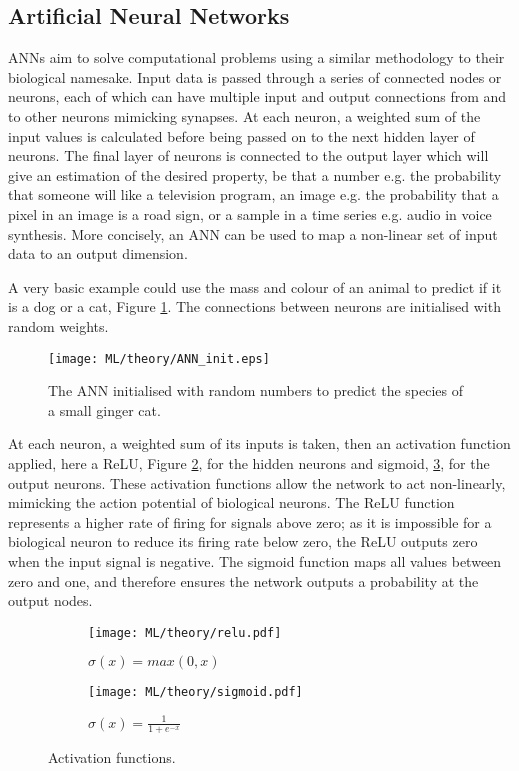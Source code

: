 \subsection{Artificial Neural Networks}
\acp{ANN} aim to solve computational problems using a similar methodology to their biological namesake. Input data is passed through a series of connected nodes or neurons, each of which can have multiple input and output connections from and to other neurons mimicking synapses. At each neuron, a weighted sum of the input values is calculated before being passed on to the next hidden layer of neurons. The final layer of neurons is connected to the output layer which will give an estimation of the desired property, be that a number e.g. the probability that someone will like a television program, an image e.g. the probability that a pixel in an image is a road sign, or a sample in a time series e.g. audio in voice synthesis. More concisely, an \ac{ANN} can be used to map a non-linear set of input data to an output dimension.

A very basic example could use the mass and colour of an animal to predict if it is a dog or a cat, Figure \ref{fig:ml_theory_init}. The connections between neurons are initialised with random weights. 

\begin{figure}[H]
	\centering
	\texttt{[image: ML/theory/ANN\_init.eps]}
	\caption{The \ac{ANN} initialised with random numbers to predict the species of a small ginger cat.}
	\label{fig:ml_theory_init}	
\end{figure}

At each neuron, a weighted sum of its inputs is taken, then an activation function applied, here a \ac{ReLU}, Figure \ref{fig:ml_theory_activation_relu}, for the hidden neurons and sigmoid, \ref{fig:ml_theory_activation_sigmoid}, for the output neurons. These activation functions allow the network to act non-linearly, mimicking the action potential of biological neurons. The \ac{ReLU} function represents a higher rate of firing for signals above zero; as it is impossible for a biological neuron to reduce its firing rate below zero, the \ac{ReLU} outputs zero when the input signal is negative. The sigmoid function maps all values between zero and one, and therefore ensures the network outputs a probability at the output nodes.

\begin{figure}[H]
	\centering
	\begin{subfigure}[c]{0.47\textwidth}
		\centering
		\texttt{[image: ML/theory/relu.pdf]}
		\caption{$\sigma (x) = max(0, x)$}
		\label{fig:ml_theory_activation_relu}
	\end{subfigure}
	\hfill
	\begin{subfigure}[c]{0.47\textwidth}
		\centering
		\texttt{[image: ML/theory/sigmoid.pdf]}
		\caption{$\sigma(x) = \frac{1}{1 + e^{-x}}$}
		\label{fig:ml_theory_activation_sigmoid}
	\end{subfigure}
	\caption{Activation functions.}
	\label{fig:ml_theory_activation}
\end{figure}

